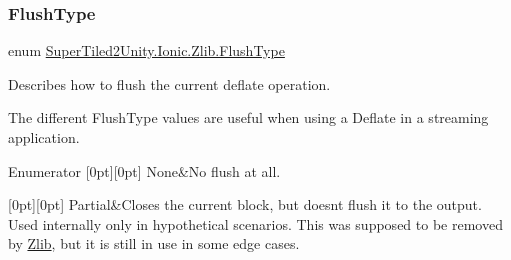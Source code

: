 \subsubsection{\texorpdfstring{Flush\+Type}{FlushType}}
{\footnotesize\ttfamily enum \mbox{\hyperlink{namespace_super_tiled2_unity_1_1_ionic_1_1_zlib_a2c5853fd63f03c83ac2458da1f4ff3bc}{Super\+Tiled2\+Unity.\+Ionic.\+Zlib.\+Flush\+Type}}\hspace{0.3cm}{\ttfamily [strong]}}



Describes how to flush the current deflate operation. 

The different Flush\+Type values are useful when using a Deflate in a streaming application. \begin{DoxyEnumFields}{Enumerator}
[0pt][0pt]{}\mbox{\label{namespace_super_tiled2_unity_1_1_ionic_1_1_zlib_a2c5853fd63f03c83ac2458da1f4ff3bca6adf97f83acf6453d4a6a4b1070f3754}} 
None&No flush at all.\\
\hline

[0pt][0pt]{}\mbox{\label{namespace_super_tiled2_unity_1_1_ionic_1_1_zlib_a2c5853fd63f03c83ac2458da1f4ff3bca44ffd38a6dea695cbe2b34efdcc6cf27}} 
Partial&Closes the current block, but doesn\textquotesingle{}t flush it to the output. Used internally only in hypothetical scenarios. This was supposed to be removed by \mbox{\hyperlink{namespace_super_tiled2_unity_1_1_ionic_1_1_zlib}{Zlib}}, but it is still in use in some edge cases. \\
\hline


\end{DoxyEnumFields}
